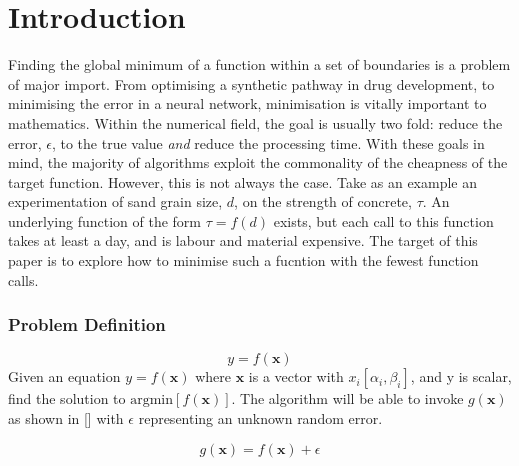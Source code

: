 
\chapter{Introduction}  %

\ifpdf
    \graphicspath{{Chapter1/Figs/Raster/}{Chapter1/Figs/PDF/}{Chapter1/Figs/}}
\else
    \graphicspath{{Chapter1/Figs/Vector/}{Chapter1/Figs/}}
\fi

Finding the global minimum of a function within a set of boundaries is a problem of major import. From optimising a synthetic pathway in drug development, to minimising the error in a neural network, minimisation is vitally important to mathematics. Within the numerical field, the goal is usually two fold: reduce the error, $\epsilon$, to the true value \textit{and} reduce the processing time. With these goals in mind, the majority of algorithms exploit the commonality of the cheapness of the target function. However, this is not always the case. Take as an example an experimentation of sand grain size, $d$, on the strength of concrete, $\tau$. An underlying function of the form $\tau=f(d)$ exists, but each call to this function takes at least a day, and is labour and material expensive. The target of this paper is to explore how to minimise such a fucntion with the fewest function calls.
 
\subsection*{Problem Definition}
\begin{equation}
    y=f(\bm{x})
\end{equation}
Given an equation $y=f(\bm{x})$ where $\bm{x}$ is a vector with $x_i [\alpha_i, \beta_i]$, and y is scalar, find the solution to $\text{argmin}[f(\bm{x})]$. The algorithm will be able to invoke $g(\bm{x})$ as shown in [] with $\epsilon$ representing an unknown random error.

\begin{equation}
    g(\bm{x}) = f(\bm{x}) + \epsilon
\end{equation}


